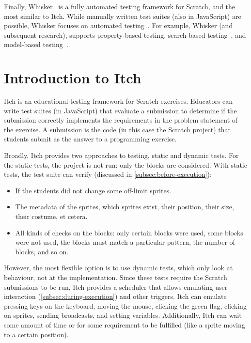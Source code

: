 \documentclass[../main]{subfiles}
\begin{document}
Finally, Whisker~\autocite{stahlbauerTestingScratchPrograms2019} is a fully automated testing framework for Scratch, and the most similar to Itch.
While manually written test suites (also in JavaScript) are possible, Whisker focuses on automated testing~\autocite{deinerAutomatedTestGeneration2023}.
For example, Whisker (and subsequent research), supports property-based testing, search-based testing~\autocite{deinerSearchBasedTestingScratch2020}, and model-based testing~\autocite{gotzModelbasedTestingScratch2022}.

\section{Introduction to Itch}\label{sec:introduction-to-itch}

Itch is an educational testing framework for Scratch exercises.
Educators can write test suites (in JavaScript) that evaluate a submission to determine if the submission correctly implements the requirements in the problem statement of the exercise.
A submission is the code (in this case the Scratch project) that students submit as the answer to a programming exercise.

Broadly, Itch provides two approaches to testing, static and dynamic tests.
For the static tests, the project is not run: only the blocks are considered.
With static tests, the test suite can verify (discussed in \cref{subsec:before-execution}):

\begin{itemize}[noitemsep]
    \item If the students did not change some off-limit sprites.
    \item The metadata of the sprites, which sprites exist, their position, their size, their costume, et cetera.
    \item All kinds of checks on the blocks: only certain blocks were used, some blocks were not used, the blocks must match a particular pattern, the number of blocks, and so on.
\end{itemize}

However, the most flexible option is to use dynamic tests, which only look at behaviour, not at the implementation.
Since these tests require the Scratch submissions to be run, Itch provides a scheduler that allows emulating user interaction (\cref{subsec:during-execution}) and other triggers.
Itch can emulate pressing keys on the keyboard, moving the mouse, clicking the green flag, clicking on sprites, sending broadcasts, and setting variables.
Additionally, Itch can wait some amount of time or for some requirement to be fulfilled (like a sprite moving to a certain position).
\end{document}
